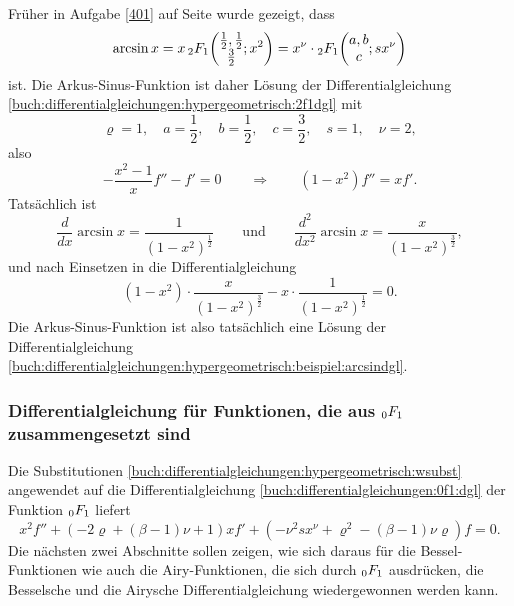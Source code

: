 \begin{beispiel}
Früher in Aufgabe \ref{401} auf Seite \pageref{401}
wurde gezeigt, dass 
\[
\arcsin x = x\,\mathstrut_2F_1\biggl(
\begin{matrix}\frac12,\frac12\\\frac32\end{matrix};x^2
\biggr)
=
x^\nu\cdot \mathstrut_2F_1\biggl(
\begin{matrix}a,b\\c\end{matrix};
sx^\nu
\biggr)
\]
ist.
Die Arkus-Sinus-Funktion ist daher Lösung der Differentialgleichung
\eqref{buch:differentialgleichungen:hypergeometrisch:2f1dgl}
mit
\[
\varrho=1,\quad
a=\frac12,\quad
b=\frac12,\quad
c=\frac32,\quad
s=1,\quad
\nu=2,
\]
also
\begin{equation}
-\frac{x^2-1}{x}f''
-f'
=
0
\qquad\Rightarrow\qquad
(1-x^2)f''=xf'.
\label{buch:differentialgleichungen:hypergeometrisch:beispiel:arcsindgl}
\end{equation}
Tatsächlich ist
\[
\frac{d}{dx}\arcsin x
=
\frac{1}{(1-x^2)^{\frac12}}
\qquad\text{und}\qquad
\frac{d^2}{dx^2} \arcsin x
=
\frac{x}{(1-x^2)^{\frac32}},
\]
und nach Einsetzen in die Differentialgleichung
\[
(1-x^2)
\cdot
\frac{x}{(1-x^2)^{\frac32}}
-
x
\cdot
\frac{1}{(1-x^2)^{\frac12}}
=
0.
\]
Die Arkus-Sinus-Funktion ist also tatsächlich eine Lösung der
Differentialgleichung
\eqref{buch:differentialgleichungen:hypergeometrisch:beispiel:arcsindgl}.
\end{beispiel}

%
%
%
\subsubsection{Differentialgleichung für Funktionen, die aus $\mathstrut_0F_1$ zusammengesetzt sind}
Die Substitutionen 
\eqref{buch:differentialgleichungen:hypergeometrisch:wsubst}
angewendet auf die Differentialgleichung
\eqref{buch:differentialgleichungen:0f1:dgl}
der Funktion $\mathstrut_0F_1$
liefert
%
\begin{equation}
x^2f''
+
(-2\varrho+(\beta-1)\nu+1)xf'
+
(-\nu^2sx^\nu + \varrho^2 -(\beta-1)\nu\varrho)f
=
0.
\label{buch:differentialgleichungen:0F1:dgl}
\end{equation}
Die nächsten zwei Abschnitte sollen zeigen, wie sich daraus für die
Bessel-Funktionen wie auch die Airy-Funktionen, die sich durch
$\mathstrut_0F_1$ ausdrücken, die Besselsche und die Airysche
Differentialgleichung wiedergewonnen werden kann.

